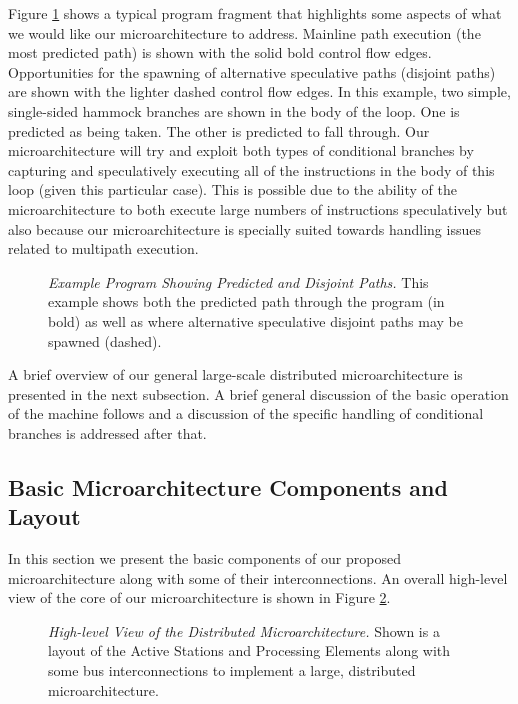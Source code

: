 \documentclass[10pt,dvips]{article}
\begin{document}
Figure \ref{fig:disjoint} shows a typical program fragment that
highlights some aspects of what we would like our microarchitecture
to address.
Mainline path execution (the most predicted path) is shown with the
solid bold control flow edges.  Opportunities for the spawning of alternative
speculative paths (disjoint paths) are shown with the lighter dashed
control flow edges.  In this example, two simple, single-sided hammock 
branches are shown in the body of the loop.  One is predicted as
being taken.  The other is predicted to fall through.  Our microarchitecture
will try and exploit both types of conditional branches by capturing
and speculatively executing
all of the instructions in the body of this loop (given this particular
case).  This is possible due to the ability of the microarchitecture to
both execute large numbers of instructions speculatively but also
because our microarchitecture is specially suited towards handling
issues related to multipath execution.

\begin{figure}
\centering
{}
\caption{{\em Example Program Showing Predicted and Disjoint
Paths.} 
This example shows both the predicted path through the program 
(in bold) as
well as where alternative speculative disjoint paths may be
spawned (dashed).}
\label{fig:disjoint}
\end{figure}

A brief overview of our general
large-scale distributed microarchitecture is presented in the next
subsection.  A brief general discussion of the basic operation
of the machine follows and a discussion of the specific handling
of conditional branches is addressed after that.
%
\subsection{Basic Microarchitecture Components and Layout}
%
In this section we present the basic components of our proposed
microarchitecture along with some of their interconnections.
An overall high-level view of the core of our microarchitecture is shown in 
Figure \ref{fig:window}.

\begin{figure}
\vspace{0.2 in}
\setlength{\epsfxsize}{10cm}%
\centerline{}
\caption{{\em High-level View of the Distributed Microarchitecture.} 
Shown is a layout of the Active Stations and Processing Elements
along with some bus interconnections to implement a large,
distributed microarchitecture.}
\label{fig:window}
\end{figure}
\end{document}
